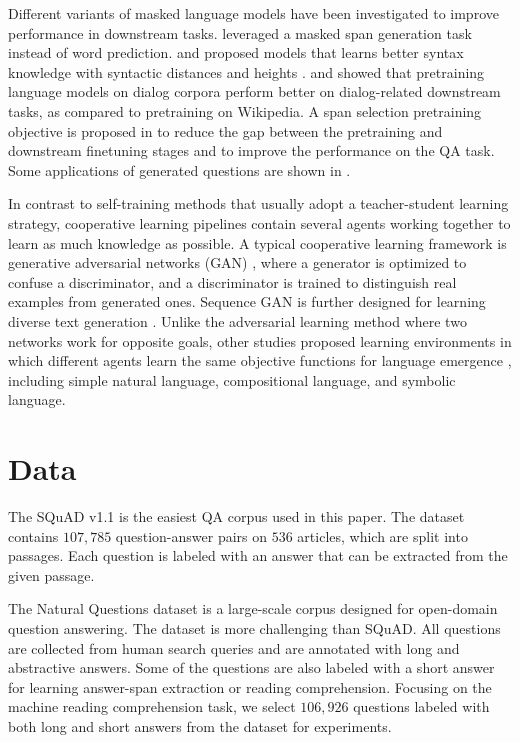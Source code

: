 \documentclass[11pt,a4paper]{article}
\begin{document}
Different variants of masked language models have been investigated to improve performance in downstream tasks. \citet{joshi2020spanbert} leveraged a masked span generation task instead of word prediction. \citet{fei2020retrofitting} and \citet{shen2020structformer} proposed models that learns better syntax knowledge with syntactic distances \cite{shen2018straight} and heights \cite{luo2019improving}. \citet{henderson2019convert} and \citet{humeau2019poly} showed that pretraining language models on dialog corpora perform better on dialog-related downstream tasks, as compared to pretraining on Wikipedia. A span selection pretraining objective is proposed in \citet{glass2019span} to reduce the gap between the pretraining and downstream finetuning stages and to improve the performance on the QA task. Some applications of generated questions are shown in \cite{lewis2021paq,jia2021question}.

In contrast to self-training methods that usually adopt a teacher-student learning strategy, cooperative learning pipelines contain several agents working together to learn as much knowledge as possible. A typical cooperative learning framework is generative adversarial networks (GAN) \cite{goodfellow2016nips,goodfellow2014generative}, where a generator is optimized to confuse a discriminator, and a discriminator is trained to distinguish real examples from generated ones. Sequence GAN is further designed for learning diverse text generation \cite{yu2017seqgan}. Unlike the adversarial learning method where two networks work for opposite goals, other studies proposed learning environments in which different agents learn the same objective functions for language emergence \cite{lazaridou2016multi,mordatch2018emergence,havrylov2017emergence}, including simple natural language, compositional language, and symbolic language.

\section{Data}
\label{sec:ddetail}
The SQuAD v1.1 is the easiest QA corpus used in this paper. The dataset contains $107,785$ question-answer pairs on $536$ articles, which are split into passages. Each question is labeled with an answer that can be extracted from the given passage.

The Natural Questions dataset is a large-scale corpus designed for open-domain question answering. The dataset is more challenging than SQuAD. All questions are collected from human search queries and are annotated with long and abstractive answers. Some of the questions are also labeled with a short answer for learning answer-span extraction or reading comprehension. Focusing on the machine reading comprehension task, we select $106,926$ questions labeled with both long and short answers from the dataset for experiments.
\end{document}
